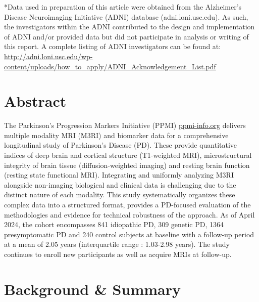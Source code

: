\documentclass[
  table]{article}
\begin{document}
*Data used in preparation of this article were obtained from the
Alzheimer's Disease Neuroimaging Initiative (ADNI) database
(adni.loni.usc.edu). As such, the investigators within the ADNI
contributed to the design and implementation of ADNI and/or provided
data but did not participate in analysis or writing of this report. A
complete listing of ADNI investigators can be found at:
\url{http://adni.loni.usc.edu/wp-content/uploads/how_to_apply/ADNI_Acknowledgement_List.pdf}

\newpage

\normalsize

\section{Abstract}\label{abstract}

The Parkinson's Progression Markers Initiative (PPMI)
\href{https://www.ppmi-info.org}{ppmi-info.org} delivers multiple
modality MRI (M3RI) and biomarker data for a comprehensive longitudinal
study of Parkinson's Disease (PD). These provide quantitative indices of
deep brain and cortical structure (T1-weighted MRI), microstructural
integrity of brain tissue (diffusion-weighted imaging) and resting brain
function (resting state functional MRI). Integrating and uniformly
analyzing M3RI alongside non-imaging biological and clinical data is
challenging due to the distinct nature of each modality. This study
systematically organizes these complex data into a structured format,
provides a PD-focused evaluation of the methodologies and evidence for
technical robustness of the approach. As of April 2024, the cohort
encompasses 841 idiopathic PD, 309 genetic PD, 1364 presymptomatic PD
and 240 control subjects at baseline with a follow-up period at a mean
of 2.05 years (interquartile range : 1.03-2.98 years). The study
continues to enroll new participants as well as acquire MRIs at
follow-up.

\section{Background \& Summary}\label{background-summary}
\end{document}
